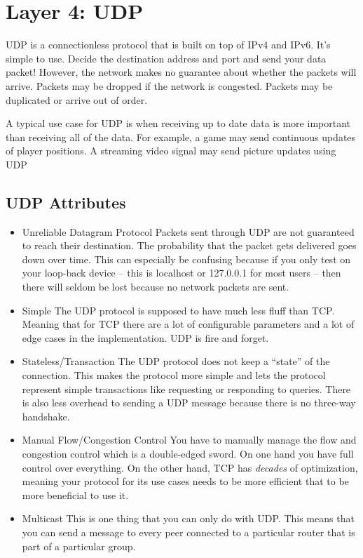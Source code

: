 \section{Layer 4: UDP}

UDP is a connectionless protocol that is built on top of IPv4 and IPv6.
It's simple to use.
Decide the destination address and port and send your data packet!
However, the network makes no guarantee about whether the packets will arrive.
Packets may be dropped if the network is congested.
Packets may be duplicated or arrive out of order.

A typical use case for UDP is when receiving up to date data is more important than receiving all of the data.
For example, a game may send continuous updates of player positions.
A streaming video signal may send picture updates using UDP

\subsection{UDP Attributes}

\begin{itemize}
\item Unreliable Datagram Protocol
  Packets sent through UDP are not guaranteed to reach their destination.
  The probability that the packet gets delivered goes down over time.
  This can especially be confusing because if you only test on your loop-back device -- this is localhost or 127.0.0.1 for most users -- then there will seldom be lost because no network packets are sent.
\item Simple
  The UDP protocol is supposed to have much less fluff than TCP.
  Meaning that for TCP there are a lot of configurable parameters and a lot of edge cases in the implementation.
  UDP is fire and forget.
\item Stateless/Transaction
  The UDP protocol does not keep a ``state'' of the connection.
  This makes the protocol more simple and lets the protocol represent simple transactions like requesting or responding to queries.
  There is also less overhead to sending a UDP message because there is no three-way handshake.
\item Manual Flow/Congestion Control
  You have to manually manage the flow and congestion control which is a double-edged sword.
  On one hand you have full control over everything.
  On the other hand, TCP has \textit{decades} of optimization, meaning your protocol for its use cases needs to be more efficient that to be more beneficial to use it.
\item Multicast
  This is one thing that you can only do with UDP.
  This means that you can send a message to every peer connected to a particular router that is part of a particular group.
\end{itemize}

